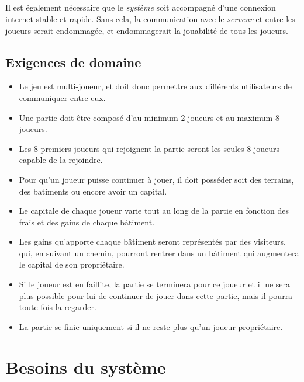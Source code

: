 \documentclass[a4paper,11pt]{report}
\begin{document}
\paragraph{}
Il est également nécessaire que le \textit{système} soit accompagné d’une connexion internet stable et rapide.
Sans cela, la communication avec le \textit{serveur} et entre les joueurs serait endommagée, et endommagerait la jouabilité de tous les joueurs.

\newpage

\section{Exigences de domaine}
\begin{itemize}
 \item Le jeu est multi-joueur, et doit donc permettre aux différents utilisateurs de communiquer entre eux.
 \item Une partie doit être composé d'au minimum 2 joueurs et au maximum 8 joueurs.
 \item Les 8 premiers joueurs qui rejoignent la partie seront les seules 8 joueurs capable de la rejoindre.
 \item Pour qu'un joueur puisse continuer à jouer, il doit posséder soit des terrains, des batiments ou encore avoir
 un capital. 
 \item Le capitale de chaque joueur varie tout au long de la partie en fonction des frais et des gains de chaque bâtiment.
 \item Les gains qu'apporte chaque bâtiment seront représentés par des visiteurs, qui, en suivant un chemin, pourront 
 rentrer dans un bâtiment qui augmentera le capital de son propriétaire.
 \item Si le joueur est en faillite, la partie se terminera pour ce joueur et il ne sera plus possible pour lui de
 continuer de jouer dans cette partie, mais il pourra toute fois la regarder.
 \item La partie se finie uniquement si il ne reste plus qu'un joueur propriétaire.

 \end{itemize}

\newpage
\chapter{Besoins du système}
\end{document}
